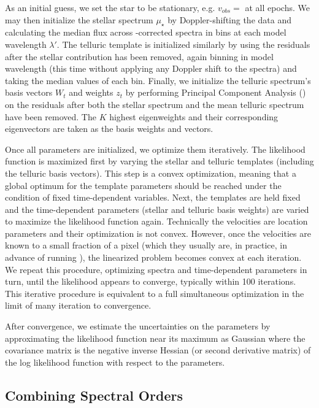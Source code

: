 \documentclass[modern]{aastex62}
\begin{document}
{As an initial guess, we set the star to be stationary, e.g. $v_{obs} = $ \BERV at all epochs. 
We may then initialize the stellar spectrum $\mu_{\star}$ by Doppler-shifting the data and calculating the median flux across \BERV-corrected spectra in bins at each model wavelength $\lambda'$. 
The telluric template is initialized similarly by using the residuals after the stellar contribution has been removed, again binning in model wavelength (this time without applying any Doppler shift to the spectra) and taking the median values of each bin. 
Finally, we initialize the telluric spectrum's basis vectors $W_t$ and weights $z_t$ by performing Principal Component Analysis () on the residuals after both the stellar spectrum and the mean telluric spectrum have been removed. 
The $K$ highest eigenweights and their corresponding eigenvectors are taken as the basis weights and vectors. 

Once all parameters are initialized, we optimize them iteratively. 
The likelihood function is maximized first by varying the stellar and telluric templates (including the telluric basis vectors). 
This step is a convex optimization, meaning that a global optimum for the template parameters should be reached under the condition of fixed time-dependent variables. 
Next, the templates are held fixed and the time-dependent parameters (stellar \RVs and telluric basis weights) are varied to maximize the likelihood function again. 
Technically the velocities are location parameters and their optimization is not convex.
However, once the velocities are known to a small fraction of a pixel (which they usually are, in practice, in advance of running \wobble), the linearized problem becomes convex at each iteration.
We repeat this procedure, optimizing spectra and time-dependent parameters in turn, until the likelihood appears to converge, typically within 100 iterations.
This iterative procedure is equivalent to a full simultaneous optimization in the limit of many iteration to convergence.

After convergence, we estimate the uncertainties on the parameters by
approximating the likelihood function near its maximum as Gaussian where the
covariance matrix is the negative inverse Hessian (or second derivative
matrix) of the log likelihood function with respect to the parameters.

\subsection{Combining Spectral Orders}
\label{s:combining-orders}

}
\end{document}
